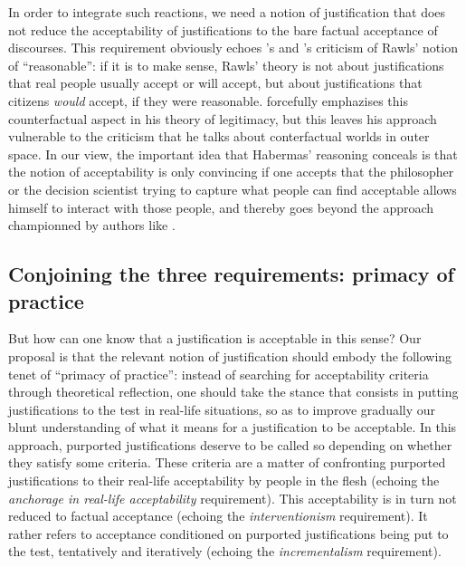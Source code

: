 \documentclass[preprint, french, english, 11pt, authoryear]{elsarticle}%
\begin{document}
In order to integrate such reactions, we need a notion of justification that does not reduce the acceptability of justifications to the bare factual acceptance of discourses. This requirement obviously echoes \cite{habermas_reconciliation_1995}'s and \cite{estlund_democratic_2009}'s criticism of Rawls' notion of “reasonable”: if it is to make sense, Rawls' theory is not about justifications that real people usually accept or will accept, but about justifications that citizens \emph{would} accept, if they were reasonable. \citet{habermas_faktizitat_1992} forcefully emphazises this counterfactual aspect in his theory of legitimacy, but this leaves his approach vulnerable to the criticism that he talks about conterfactual worlds in outer space. In our view, the important idea that Habermas' reasoning conceals is that the notion of acceptability is only convincing if one accepts that the philosopher or the decision scientist trying to capture what people can find acceptable allows himself to interact with those people, and thereby goes beyond the approach championned by authors like \cite{boltanski_justification_2006}.


\subsection{Conjoining the three requirements: primacy of practice}
But how can one know that a justification is acceptable in this sense? %
Our proposal is that the relevant notion of justification should embody the following tenet of “primacy of practice”: instead of searching for acceptability criteria through theoretical reflection, one should take the stance that consists in putting justifications to the test in real-life situations, so as to improve gradually our blunt understanding of what it means for a justification to be acceptable. In this approach, purported justifications deserve to be called so depending on whether they satisfy some criteria. These criteria are a matter of confronting purported justifications to their real-life acceptability by people in the flesh (echoing the \emph{anchorage in real-life acceptability} requirement). This acceptability is in turn not reduced to factual acceptance (echoing the \emph{interventionism} requirement). It rather refers to acceptance conditioned on purported justifications being put to the test, tentatively and iteratively (echoing the \emph{incrementalism} requirement).
\end{document}
